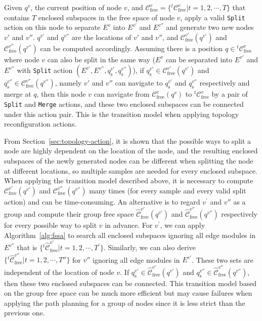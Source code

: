 \documentclass[journal]{IEEEtran}
\begin{document}
Given $q^v$, the current position of node $v$, and
$\mathcal{C}_{\mathrm{free}}^v =
\{{^t}\mathcal{C}_{\mathrm{free}}^v\vert t = 1,2,\cdots, T\}$ that
contains $T$ enclosed subspaces in the free space of node $v$, apply a
valid \texttt{Split} action on this node to separate $E^v$ into
$E^{v'}$ and $E^{v''}$ and generate two new nodes $v'$ and
$v''$. $q^{v'}$ and $q^{v''}$ are the locations of $v'$ and $v''$, and
$\mathcal{C}_{\mathrm{free}}^{v'}(q^{v'})$ and
$\mathcal{C}_{\mathrm{free}}^{v''}(q^{v''})$ can be computed
accordingly. Assuming there is a position
$q\in {^t}\mathcal{C}_{\mathrm{free}}^v$ where node $v$ can also be
split in the same way ($E^v$ can be separated into $E^{v'}$ and
$E^{v''}$ with \texttt{Split} action
$(E^{v'}, E^{v''}, q_{\mathrm{s}}^{v'}, q_{\mathrm{s}}^{v''})$), if
$q_{\mathrm{s}}^{v'}\in \mathcal{C}_{\mathrm{free}}^{v'}(q^{v'})$ and
$q_{\mathrm{s}}^{v''}\in \mathcal{C}_{\mathrm{free}}^{v''}(q^{v''})$,
namely $v'$ and $v''$ can navigate to $q_{\mathrm{s}}^{v'}$ and
$q_{\mathrm{s}}^{v''}$ respectively and merge at $q$, then this node
$v$ can navigate from $\mathcal{C}_{\mathrm{free}}^v(q^v)$ to
${^t}\mathcal{C}_{\mathrm{free}}^v$ by a pair of \texttt{Split} and
\texttt{Merge} actions, and these two enclosed subspaces can be
connected under this action pair. This is the transition model when
applying topology reconfiguration actions.

From Section~\ref{sec:topology-action}, it is shown that the possible
ways to split a node are highly dependent on the location of the node,
and the resulting enclosed subspaces of the newly generated nodes can
be different when splitting the node at different locations, so
multiple samples are needed for every enclosed subspace. When applying
the transition model described above, it is necessary to compute
$\mathcal{C}_{\mathrm{free}}^{v'}(q^{v'})$ and
$\mathcal{C}_{\mathrm{free}}^{v''}(q^{v''})$ many times (for every
sample and every valid split action) and can be time-consuming. An
alternative is to regard $v^\prime$ and $v''$ as a group and compute
their group free space
$\widehat{\mathcal{C}}_{\mathrm{free}}^{v'}(q^{v'})$ and
$\widehat{\mathcal{C}}_{\mathrm{free}}^{v''}(q^{v''})$ respectively
for every possible way to split $v$ in advance. For $v^\prime$, we can
apply Algorithm~\ref{alg:fssa} to search all enclosed subspaces
ignoring all edge modules in $E^{v''}$ that is
$\{{^t}\widehat{\mathcal{C}}_{\mathrm{free}}^{v'}\vert t = 1,2,\cdots,
T^{\prime}\}$. Similarly, we can also derive
$\{{^t}\widehat{\mathcal{C}}_{\mathrm{free}}^{v''}\vert t =
1,2,\cdots, T''\}$ for $v''$ ignoring all edge modules in
$E^{v'}$. These two sets are independent of the location of node $v$.
If
$q_{\mathrm{s}}^{v'}\in
\widehat{\mathcal{C}}_{\mathrm{free}}^{v'}(q^{v'})$ and
$q_{\mathrm{s}}^{v''}\in
\widehat{\mathcal{C}}_{\mathrm{free}}^{v''}(q^{v''})$, then these two
enclosed subspaces can be connected. This transition model based on
the group free space can be much more efficient but may cause failures
when applying the path planning for a group of nodes since it is less
strict than the previous one.
\end{document}
